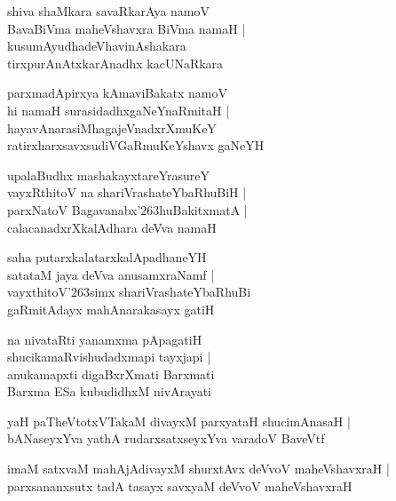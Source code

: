 \documentclass[twoside,12pt,openright]{book}
\def\S{\char'263}
\newcounter{shloka}[chapter]
\begin{document}
\begin{shloka}
shiva shaMkara savaRkarAya namoV \\
BavaBiVma maheVshavxra BiVma namaH |\\
kusumAyudhadeVhavinAshakara \\
tirxpurAnAtxkarAnadhx kacUNaRkara
\end{shloka}

\begin{shloka}
parxmadApirxya kAmaviBakatx namoV \\
hi namaH surasidadhxgaNeYnaRmitaH |\\
hayavAnarasiMhagajeVnadxrXmuKeY \\
ratirxharxsavxsudiVGaRmuKeYshavx gaNeYH 
\end{shloka}

\begin{shloka}
upalaBudhx mashakayxtareYrasureY \\
vayxRthitoV na shariVrashateYbaRhuBiH |\\
parxNatoV Bagavanabx\S huBakitxmatA |\\
calacanadxrXkalAdhara deVva namaH
\end{shloka}

\begin{shloka}
saha putarxkalatarxkalApadhaneYH \\
satataM jaya deVva anusamxraNamf |\\
vayxthitoV\S simx shariVrashateYbaRhuBi\\
gaRmitAdayx mahAnarakasayx gatiH\\
\end{shloka}

\begin{shloka}
na nivataRti yanamxma pApagatiH\\
shucikamaRvishudadxmapi tayxjapi |\\
anukamapxti digaBxrXmati Barxmati \\
Barxma ESa kubudidhxM nivArayati \\
\end{shloka}

\begin{shloka}
yaH paTheVtotxVTakaM divayxM parxyataH shucimAnasaH |\\
bANaseyxYva yathA rudarxsatxseyxYva varadoV BaveVtf
\end{shloka}

\begin{shloka}
imaM satxvaM mahAjAdivayxM shurxtAvx deVvoV maheVshavxraH |\\
parxsananxsutx tadA tasayx savxyaM deVvoV maheVshavxraH
\end{shloka}
\end{document}
